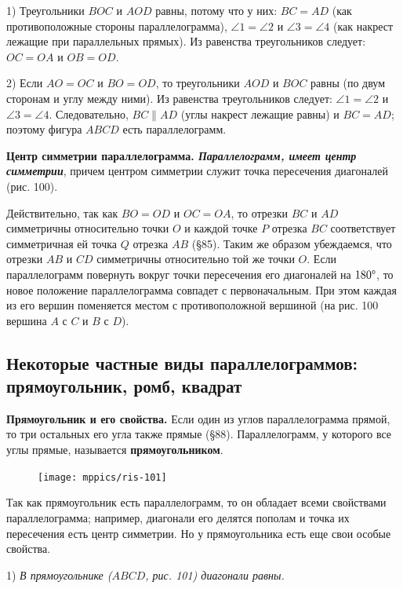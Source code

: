 \documentclass[oneside]{book}
\begin{document}
1) Треугольники $BOC$ и $AOD$ равны, потому что у них:
$BC=AD$ (как противоположные стороны параллелограмма), $\angle 1 = \angle 2$ и $\angle 3 = \angle 4$ (как накрест лежащие при параллельных прямых).
Из равенства треугольников следует:
$OC=OA$ и $OB=OD$.


2) Если $AO=OC$ и $BO=OD$, то треугольники $AOD$ и $BOC$ равны (по двум сторонам и углу между ними).
Из равенства треугольников следует:
$\angle 1 = \angle 2$ и $\angle 3 = \angle 4$.
Следовательно, $BC \parallel AD$ (углы накрест лежащие равны) и $BC=AD$;
поэтому фигура $ABCD$ есть параллелограмм.

\textbf{Центр симметрии параллелограмма.
\emph{Параллелограмм, имеет центр симметрии}}, причем центром симметрии служит точка пересечения диагоналей (рис. 100).

Действительно, так как $BO=OD$ и $OC=OA$, то отрезки $BC$ и $AD$ симметричны относительно точки $O$ и каждой точке $P$ отрезка $BC$ соответствует симметричная ей точка $Q$ отрезка $AB$ (§85).
Таким же образом убеждаемся, что отрезки $AB$ и $CD$ симметричны относительно той же точки $O$.
Если параллелограмм повернуть вокруг точки пересечения его диагоналей на $180\degree$, то новое положение параллелограмма совпадет с первоначальным.
При этом каждая из его вершин поменяется местом с противоположной вершиной 
(на рис. 100 вершина $A$ с $C$ и $B$ с $D$).

\subsection*{Некоторые частные виды параллелограммов:
прямоугольник, ромб, квадрат}

\textbf{Прямоугольник и его свойства.}
Если один из углов параллелограмма прямой, то три остальных его угла также прямые (§88).
Параллелограмм, у которого все углы прямые, называется \textbf{прямоугольником}.

\begin{figure}
\centering
\texttt{[image: mppics/ris-101]}
\caption{}
\end{figure}

Так как прямоугольник есть параллелограмм, то он обладает всеми свойствами параллелограмма;
например, диагонали его делятся пополам и точка их пересечения есть центр симметрии.
Но у прямоугольника есть еще свои особые свойства.

1) \emph{В прямоугольнике \emph{($ABCD$, рис. 101)} диагонали равны.}
\end{document}
